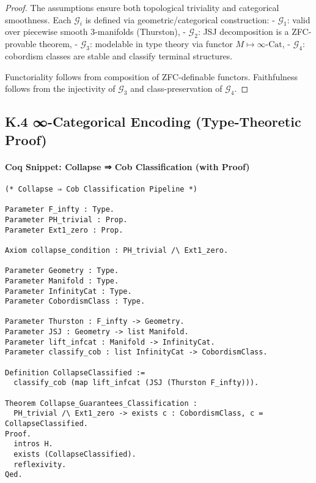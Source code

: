 \documentclass[11pt]{article}
\begin{document}
\begin{axiom}
\begin{axiom}
\begin{proof}
The assumptions ensure both topological triviality and categorical smoothness.  
Each \( \mathcal{G}_i \) is defined via geometric/categorical construction:
- \( \mathcal{G}_1 \): valid over piecewise smooth 3-manifolds (Thurston),
- \( \mathcal{G}_2 \): JSJ decomposition is a ZFC-provable theorem,
- \( \mathcal{G}_3 \): modelable in type theory via functor \( M \mapsto \infty\text{-Cat} \),
- \( \mathcal{G}_4 \): cobordism classes are stable and classify terminal structures.

Functoriality follows from composition of ZFC-definable functors.  
Faithfulness follows from the injectivity of \( \mathcal{G}_3 \) and class-preservation of \( \mathcal{G}_4 \).
\end{proof}

\subsection*{K.4 ∞-Categorical Encoding (Type-Theoretic Proof)}

\paragraph{Coq Snippet: Collapse ⇒ Cob Classification (with Proof)}

\begin{lstlisting}[language=Coq, caption=Collapse Classification in Coq Type Theory]
(* Collapse ⇒ Cob Classification Pipeline *)

Parameter F_infty : Type.
Parameter PH_trivial : Prop.
Parameter Ext1_zero : Prop.

Axiom collapse_condition : PH_trivial /\ Ext1_zero.

Parameter Geometry : Type.
Parameter Manifold : Type.
Parameter InfinityCat : Type.
Parameter CobordismClass : Type.

Parameter Thurston : F_infty -> Geometry.
Parameter JSJ : Geometry -> list Manifold.
Parameter lift_infcat : Manifold -> InfinityCat.
Parameter classify_cob : list InfinityCat -> CobordismClass.

Definition CollapseClassified :=
  classify_cob (map lift_infcat (JSJ (Thurston F_infty))).

Theorem Collapse_Guarantees_Classification :
  PH_trivial /\ Ext1_zero -> exists c : CobordismClass, c = CollapseClassified.
Proof.
  intros H.
  exists (CollapseClassified).
  reflexivity.
Qed.
\end{lstlisting}


\end{axiom}
\end{axiom}
\end{document}
